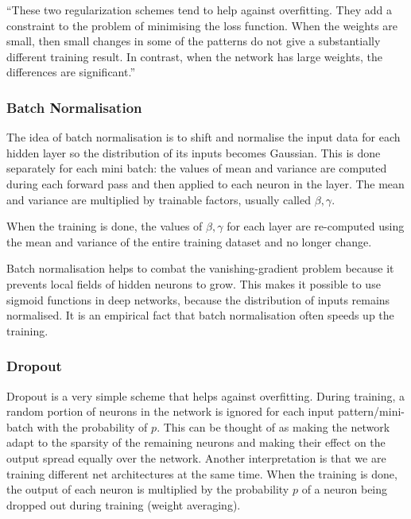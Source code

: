 \enquote{These two regularization schemes tend to help against overfitting. They add a constraint to the problem of minimising the loss function. When the weights are small, then small changes in some of the patterns do not give a substantially different training result. In contrast, when the network has large weights, the differences are significant.} \cite{mehlig}

\subsubsection{Batch Normalisation}

The idea of batch normalisation is to shift and normalise the input data for each
hidden layer so the distribution of its inputs becomes Gaussian. This is done separately for
each mini batch: the values of mean and variance are computed during each forward pass and then applied to each neuron in the layer. The mean and variance are multiplied by trainable factors, usually called $ \beta, \gamma $. \cite{stanford-L6} \cite{mehlig}

When the training is done, the values of $ \beta, \gamma $ for each layer are re-computed using the mean and variance of the entire training dataset and no longer change. \cite{issue}

Batch normalisation helps to combat the vanishing-gradient problem because it prevents local fields of hidden neurons to grow. This makes it possible to use sigmoid functions in deep networks, because the distribution of inputs remains normalised. It is an empirical fact that batch normalisation often speeds up the training. \cite{mehlig}

\subsubsection{Dropout}
\label{dropout_sec}

Dropout is a very simple scheme that helps against overfitting. During training, a random portion of neurons in the network is ignored for each input pattern/mini-batch with the probability of $ p $. This can be thought of as making the network adapt to the sparsity of the remaining neurons and making their effect on the output spread equally over the network. Another interpretation is that we are training different net architectures at the same time. When the training is done, the output of each neuron is multiplied by the probability $ p $ of a neuron being dropped out during training (weight averaging). \cite{mehlig} \cite{stanford-L7}

